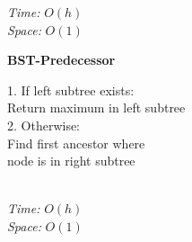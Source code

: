 {\begin{minipage}[t]{1\textwidth}
\begin{minipage}[t]{0.19\textwidth}
        \textit{Time:} \(O(h)\)\\
        \textit{Space:} \(O(1)\)
    \end{minipage}
    \hfill
    \begin{minipage}[t]{0.19\textwidth}
        \centering
        \textbf{\scriptsize BST-Predecessor}\\[2pt]
        \scriptsize
        \begin{minipage}[t]{\textwidth}
            \scriptsize
            1. If left subtree exists:\\
            \quad Return maximum in left subtree\\
            2. Otherwise:\\
            \quad Find first ancestor where\\
            \quad node is in right subtree
        \end{minipage}\\[4pt]
        \textit{Time:} \(O(h)\)\\
        \textit{Space:} \(O(1)\)
    \end{minipage}
\end{minipage}} 